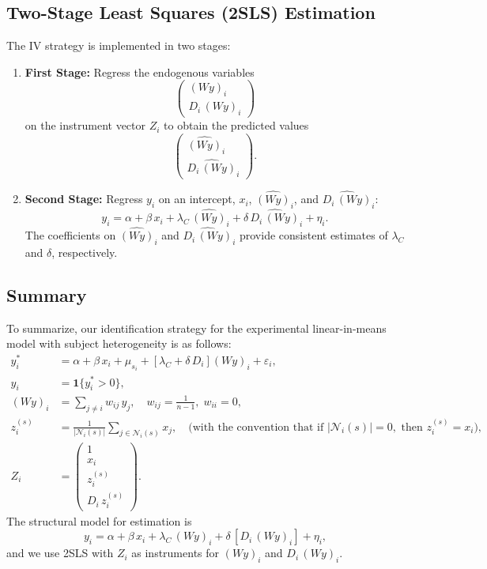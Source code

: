 \subsection*{Two-Stage Least Squares (2SLS) Estimation}

The IV strategy is implemented in two stages:
\begin{enumerate}
    \item \textbf{First Stage:} Regress the endogenous variables
    \[
    \begin{pmatrix} (Wy)_i \\ D_i\,(Wy)_i \end{pmatrix}
    \]
    on the instrument vector \( Z_i \) to obtain the predicted values
    \[
    \begin{pmatrix} \widehat{(Wy)}_i \\ \widehat{D_i\,(Wy)}_i \end{pmatrix}.
    \]
    
    \item \textbf{Second Stage:} Regress \( y_i \) on an intercept, \( x_i \), \( \widehat{(Wy)}_i \), and \( \widehat{D_i\,(Wy)}_i \):
    \[
    y_i = \alpha + \beta\, x_i + \lambda_C\, \widehat{(Wy)}_i + \delta\, \widehat{D_i\,(Wy)}_i + \eta_i.
    \]
    The coefficients on \( \widehat{(Wy)}_i \) and \( \widehat{D_i\,(Wy)}_i \) provide consistent estimates of \( \lambda_C \) and \( \delta \), respectively.
\end{enumerate}

\subsection*{Summary}

To summarize, our identification strategy for the experimental linear-in-means model with subject heterogeneity is as follows:
\begin{align*}
y_i^* &= \alpha + \beta\, x_i + \mu_{s_i} + \left[\lambda_C + \delta\, D_i\right] (Wy)_i + \varepsilon_i, \\
y_i &= \mathbf{1}\{ y_i^* > 0 \}, \\
(Wy)_i &= \sum_{j \neq i} w_{ij}\, y_j, \quad w_{ij}=\frac{1}{n-1}, \; w_{ii}=0, \\
z_i^{(s)} &= \frac{1}{|\mathcal{N}_i(s)|} \sum_{j\in\mathcal{N}_i(s)} x_j, \quad \text{(with the convention that if } |\mathcal{N}_i(s)| = 0, \text{ then } z_i^{(s)} = x_i\text{)}, \\
Z_i &= \begin{pmatrix} 1 \\ x_i \\ z_i^{(s)} \\ D_i\, z_i^{(s)} \end{pmatrix}.
\end{align*}
The structural model for estimation is
\[
y_i = \alpha + \beta\, x_i + \lambda_C\,(Wy)_i + \delta\, \left[ D_i\,(Wy)_i \right] + \eta_i,
\]
and we use 2SLS with \(Z_i\) as instruments for \((Wy)_i\) and \(D_i\,(Wy)_i\).

